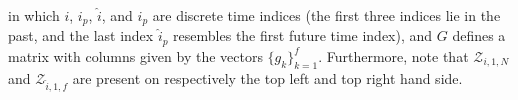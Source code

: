 in which $i$, $i_p$, $\hat{i}$, and $\hat{i}_p$ are discrete time indices (the first three indices lie in the past, and the last index $\hat{i}_p$ resembles the first future time index), and $G$ defines a matrix with columns given by the vectors $\{g_k\}^f_{k=1}$. Furthermore, note that $\mathcal{Z}_{i,1,N}$ and $\mathcal{Z}_{\hat{i},1,f}$ are present on respectively the top left and top right hand side.

